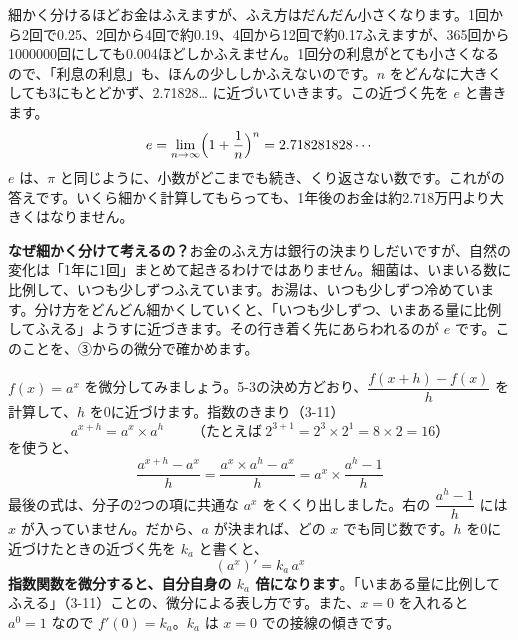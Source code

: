\begin{bkfigure}
\end{bkfigure}

細かく分けるほどお金はふえますが、ふえ方はだんだん小さくなります。1回から2回で0.25、2回から4回で約0.19、4回から12回で約0.17ふえますが、365回から1000000回にしても0.004ほどしかふえません。1回分の利息がとても小さくなるので、「利息の利息」も、ほんの少ししかふえないのです。$n$ をどんなに大きくしても3にもとどかず、2.71828… に近づいていきます。この近づく先を $e$ と書きます。
\[ e=\lim_{n\to\infty}\Bigl(1+\frac{1}{n}\Bigr)^n=2.718281828\cdots \]
$e$ は、$\pi$ と同じように、小数がどこまでも続き、くり返さない数です。これが\bkhatenaref の答えです。いくら細かく計算してもらっても、1年後のお金は約2.718万円より大きくはなりません。

\noindent\textbf{なぜ細かく分けて考えるの？}\quad お金のふえ方は銀行の決まりしだいですが、自然の変化は「1年に1回」まとめて起きるわけではありません。細菌は、いまいる数に比例して、いつも少しずつふえています。お湯は、いつも少しずつ冷めています。分け方をどんどん細かくしていくと、「いつも少しずつ、いまある量に比例してふえる」ようすに近づきます。その行き着く先にあらわれるのが $e$ です。このことを、③からの微分で確かめます。


\label{bk:5-14:shisuu}$f(x)=a^x$ を微分してみましょう。5-3の決め方どおり、$\dfrac{f(x+h)-f(x)}{h}$ を計算して、$h$ を0に近づけます。指数のきまり（3-11）
\[ a^{x+h}=a^x\times a^h\qquad（たとえば\ 2^{3+1}=2^3\times2^1=8\times2=16） \]
を使うと、
\[ \frac{a^{x+h}-a^x}{h}=\frac{a^x\times a^h-a^x}{h}=a^x\times\frac{a^h-1}{h} \]
最後の式は、分子の2つの項に共通な $a^x$ をくくり出しました。右の $\dfrac{a^h-1}{h}$ には $x$ が入っていません。だから、$a$ が決まれば、どの $x$ でも同じ数です。$h$ を0に近づけたときの近づく先を $k_a$ と書くと、
\[ (a^x)'=k_a\,a^x \]
\textbf{指数関数を微分すると、自分自身の $k_a$ 倍になります}。「いまある量に比例してふえる」（3-11）ことの、微分による表し方です。また、$x=0$ を入れると $a^0=1$ なので $f'(0)=k_a$。$k_a$ は $x=0$ での接線の傾きです。

